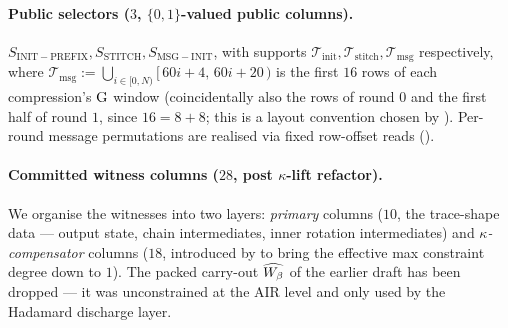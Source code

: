 \paragraph{Public selectors ($3$, $\{0,1\}$-valued public columns).}
$S_{\mathrm{INIT-PREFIX}}, S_{\mathrm{STITCH}}, S_{\mathrm{MSG-INIT}}$,
with supports $\mathcal{T}_{\mathrm{init}}, \mathcal{T}_{\mathrm{stitch}},
\mathcal{T}_{\mathrm{msg}}$ respectively, where
$\mathcal{T}_{\mathrm{msg}} := \bigcup_{i \in [0,N)} [\,60i + 4,\,60i + 20\,)$
is the first $16$ rows of each compression's $\operatorname{G}$ window
(coincidentally also the rows of round $0$ and the first half of
round $1$, since $16 = 8 + 8$; this is a layout convention chosen by
). Per-round message permutations are
realised via fixed row-offset reads ().

\paragraph{Committed witness columns ($28$, post $\kappa$-lift refactor).}
We organise the witnesses into two layers: \emph{primary} columns
($10$, the trace-shape data — output state, chain intermediates,
inner rotation intermediates) and \emph{$\kappa$-compensator}
columns ($18$, introduced by  to bring the
effective max constraint degree down to $1$). The packed carry-out
$\widehat{W_\beta}$ of the earlier draft has been dropped — it was
unconstrained at the AIR level and only used by the Hadamard
discharge layer.

